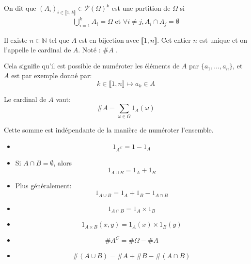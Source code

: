     \begin{definition}
      On dit que $\left(A_i\right)_{i\in\llbracket 1,k\rrbracket} \in \mathcal{P}(\Omega)^k$
      est une partition de $\Omega$ si
      \begin{eqnarray*}
        \bigcup_{i=1}^k A_i = \Omega \text{ et } \forall i\neq j, A_i\cap A_j = \emptyset
      \end{eqnarray*}
    \end{definition}

    \begin{definition}
      Il existe $n\in\mathbb{N}$ tel que $A$ est en bijection avec $\llbracket 1,n \rrbracket$.
      Cet entier $n$ est unique et on l'appelle le cardinal de $A$.
      Noté : $\#A$ .%
    \end{definition}

    Cela signifie qu'il est possible de numéroter les éléments de $A$ par $\{a_1, \dots, a_n\}$,
    et $A$ est par exemple donné par:
    \[ k \in \llbracket 1, n \rrbracket \mapsto a_k \in A\]

    \begin{proposition}
      Le cardinal de $A$ vaut:
      \[\#A = \sum_{\omega\in \Omega} 1_A(\omega)\]

      Cette somme est indépendante de la manière de numéroter l'ensemble.
    \end{proposition}

    \begin{proposition}
      \begin{itemize}
        \item \[1_{A^C} = 1-1_A\]
        \item Si $A\cap B = \emptyset$, alors
              \[1_{A\cup B} = 1_A + 1_B\]
        \item Plus généralement:
              \[1_{A\cup B} = 1_A + 1_B - 1_{A\cap B}\]
        \item \[1_{A\cap B} = 1_A \times 1_B\]
        \item \[1_{A\times B}(x,y) = 1_A(x)\times 1_B(y)\]
      \end{itemize}
    \end{proposition}

    \begin{corollaire}
      \begin{itemize}
        \item \[\#A^C = \#\Omega - \#A\]
        \item \[
          \#(A\cup B) = \#A + \#B - \#(A\cap B)
        \]
      \end{itemize}
    \end{corollaire}

